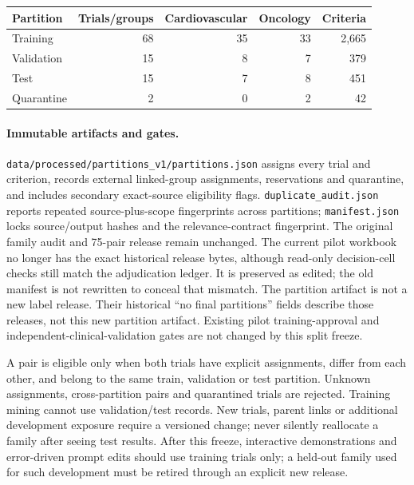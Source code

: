 \documentclass[10pt,letterpaper]{article}
\newcommand{\pathcode}[1]{\nolinkurl{#1}}
\begin{document}
\begin{center}
\begin{tabular}{@{}lrrrr@{}}
\toprule Partition & Trials/groups & Cardiovascular & Oncology & Criteria\\\midrule
Training & 68 & 35 & 33 & 2,665\\
Validation & 15 & 8 & 7 & 379\\
Test & 15 & 7 & 8 & 451\\
Quarantine & 2 & 0 & 2 & 42\\\bottomrule
\end{tabular}
\end{center}


\paragraph{Immutable artifacts and gates.}
\pathcode{data/processed/partitions_v1/partitions.json} assigns every trial and
criterion, records external linked-group assignments, reservations and quarantine,
and includes secondary exact-source eligibility flags.
\pathcode{duplicate_audit.json} reports repeated source-plus-scope fingerprints
across partitions; \pathcode{manifest.json} locks source/output hashes and the
relevance-contract fingerprint. The original family audit and 75-pair release
remain unchanged. The current pilot workbook no longer has the exact
historical release bytes, although read-only decision-cell checks still match
the adjudication ledger. It is preserved as edited; the old manifest is not
rewritten to conceal that mismatch. The partition artifact is not a new label release. Their historical ``no final partitions'' fields describe
those releases, not this new partition artifact. Existing pilot training-approval
and independent-clinical-validation gates are not changed by this split freeze.

A pair is eligible only when both trials have explicit assignments, differ from
each other, and belong to the same train, validation or test partition. Unknown
assignments, cross-partition pairs and quarantined trials are rejected. Training
mining cannot use validation/test records. New trials, parent links or additional
development exposure require a versioned change; never silently reallocate a
family after seeing test results. After this freeze, interactive demonstrations
and error-driven prompt edits should use training trials only; a held-out
family used for such development must be retired through an explicit new release.
\end{document}
